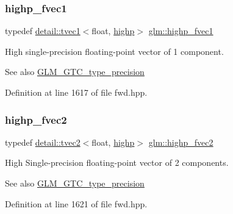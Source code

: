 \subsubsection{\texorpdfstring{highp\+\_\+fvec1}{highp\_fvec1}}
{\footnotesize\ttfamily typedef \hyperlink{structglm_1_1detail_1_1tvec1}{detail\+::tvec1}$<$float, \hyperlink{namespaceglm_a0f04f086094c747d227af4425893f545ac6f7eab42eacbb10d59a58e95e362074}{highp}$>$ \hyperlink{group__gtc__type__precision_ga5d9f2208253856df60a57925f92ff0c8}{glm\+::highp\+\_\+fvec1}}

High single-\/precision floating-\/point vector of 1 component. \begin{DoxySeeAlso}{See also}
\hyperlink{group__gtc__type__precision}{G\+L\+M\+\_\+\+G\+T\+C\+\_\+type\+\_\+precision} 
\end{DoxySeeAlso}


Definition at line 1617 of file fwd.\+hpp.

\mbox{\label{group__gtc__type__precision_gab58ecc53699d45f4f88d67bbff084c54}} 
\subsubsection{\texorpdfstring{highp\+\_\+fvec2}{highp\_fvec2}}
{\footnotesize\ttfamily typedef \hyperlink{structglm_1_1detail_1_1tvec2}{detail\+::tvec2}$<$float, \hyperlink{namespaceglm_a0f04f086094c747d227af4425893f545ac6f7eab42eacbb10d59a58e95e362074}{highp}$>$ \hyperlink{group__gtc__type__precision_gab58ecc53699d45f4f88d67bbff084c54}{glm\+::highp\+\_\+fvec2}}

High Single-\/precision floating-\/point vector of 2 components. \begin{DoxySeeAlso}{See also}
\hyperlink{group__gtc__type__precision}{G\+L\+M\+\_\+\+G\+T\+C\+\_\+type\+\_\+precision} 
\end{DoxySeeAlso}


Definition at line 1621 of file fwd.\+hpp.

\mbox{\label{group__gtc__type__precision_ga79b821fc8ae989b12bb43e2cd3932580}} 
